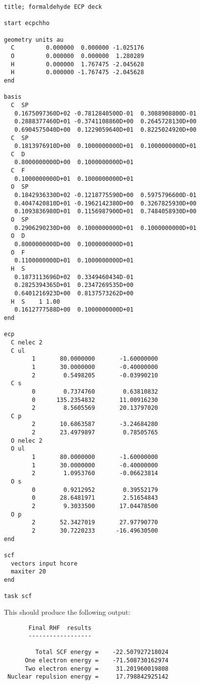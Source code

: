 \begin{verbatim}
title; formaldehyde ECP deck

start ecpchho

geometry units au
  C         0.000000  0.000000 -1.025176
  O         0.000000  0.000000  1.280289
  H         0.000000  1.767475 -2.045628
  H         0.000000 -1.767475 -2.045628
end

basis 
  C  SP
   0.1675097360D+02 -0.7812840500D-01  0.3088908800D-01
   0.2888377460D+01 -0.3741108860D+00  0.2645728130D+00
   0.6904575040D+00  0.1229059640D+01  0.8225024920D+00
  C  SP
   0.1813976910D+00  0.1000000000D+01  0.1000000000D+01
  C  D
   0.8000000000D+00  0.1000000000D+01
  C  F
   0.1000000000D+01  0.1000000000D+01
  O  SP
   0.1842936330D+02 -0.1218775590D+00  0.5975796600D-01
   0.4047420810D+01 -0.1962142380D+00  0.3267825930D+00
   0.1093836980D+01  0.1156987900D+01  0.7484058930D+00
  O  SP
   0.2906290230D+00  0.1000000000D+01  0.1000000000D+01
  O  D
   0.8000000000D+00  0.1000000000D+01
  O  F
   0.1100000000D+01  0.1000000000D+01
  H  S
   0.1873113696D+02  0.3349460434D-01
   0.2825394365D+01  0.2347269535D+00
   0.6401216923D+00  0.8137573262D+00
  H  S    1 1.00
   0.1612777588D+00  0.1000000000D+01
end

ecp
  C nelec 2
  C ul
        1       80.0000000       -1.60000000
        1       30.0000000       -0.40000000
        2        0.5498205       -0.03990210
  C s
        0        0.7374760        0.63810832
        0      135.2354832       11.00916230
        2        8.5605569       20.13797020
  C p
        2       10.6863587       -3.24684280
        2       23.4979897        0.78505765
  O nelec 2
  O ul
        1       80.0000000       -1.60000000
        1       30.0000000       -0.40000000
        2        1.0953760       -0.06623814
  O s
        0        0.9212952        0.39552179
        0       28.6481971        2.51654843
        2        9.3033500       17.04478500
  O p
        2       52.3427019       27.97790770
        2       30.7220233      -16.49630500
end

scf
  vectors input hcore
  maxiter 20
end

task scf
\end{verbatim}

This should produce the following output:

\begin{verbatim}
       Final RHF  results 
       ------------------ 

         Total SCF energy =    -22.507927218024
      One electron energy =    -71.508730162974
      Two electron energy =     31.201960019808
 Nuclear repulsion energy =     17.798842925142
\end{verbatim}



